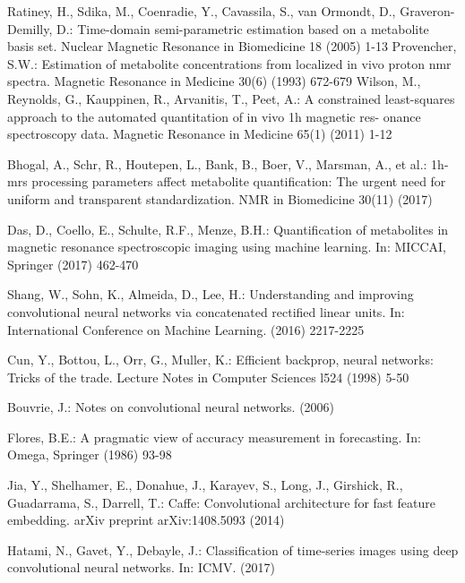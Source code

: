 \documentclass{llncs}
\begin{document}
%
%
\begin{thebibliography}{5}
%
Ratiney, H., Sdika, M., Coenradie, Y., Cavassila, S., van Ormondt, D., Graveron-
Demilly, D.: Time-domain semi-parametric estimation based on a metabolite basis
set. Nuclear Magnetic Resonance in Biomedicine 18 (2005) 1-13
%
Provencher, S.W.: Estimation of metabolite concentrations from localized in vivo
proton nmr spectra. Magnetic Resonance in Medicine 30(6) (1993) 672-679
%
Wilson, M., Reynolds, G., Kauppinen, R., Arvanitis, T., Peet, A.: A constrained
least-squares approach to the automated quantitation of in vivo 1h magnetic res-
onance spectroscopy data. Magnetic Resonance in Medicine 65(1) (2011) 1-12

Bhogal, A., Schr, R., Houtepen, L., Bank, B., Boer, V., Marsman, A., et al.: 1h-
mrs processing parameters affect metabolite quantification: The urgent need for
uniform and transparent standardization. NMR in Biomedicine 30(11) (2017)

Das, D., Coello, E., Schulte, R.F., Menze, B.H.: Quantification of metabolites in
magnetic resonance spectroscopic imaging using machine learning. In: MICCAI,
Springer (2017) 462-470

%
Shang, W., Sohn, K., Almeida, D., Lee, H.: Understanding and improving convolutional neural networks via concatenated rectified linear units. In: International
Conference on Machine Learning. (2016) 2217-2225

%
Cun, Y., Bottou, L., Orr, G., Muller, K.: Efficient backprop, neural networks:
Tricks of the trade. Lecture Notes in Computer Sciences l524 (1998) 5-50
%

Bouvrie, J.: Notes on convolutional neural networks. (2006)

Flores, B.E.: A pragmatic view of accuracy measurement in forecasting. In: Omega, Springer (1986) 93-98

Jia, Y., Shelhamer, E., Donahue, J., Karayev, S., Long, J., Girshick, R., Guadarrama, S., Darrell, T.: Caffe: Convolutional architecture for fast feature embedding.
arXiv preprint arXiv:1408.5093 (2014)


Hatami, N., Gavet, Y., Debayle, J.: Classification of time-series images using deep
convolutional neural networks. In: ICMV. (2017)

\end{thebibliography}
\end{document}
